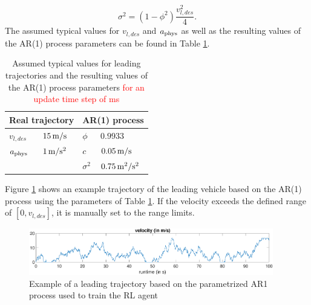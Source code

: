 \documentclass[review]{elsarticle}
\providecommand{\red}[1]{\textcolor{red}{#1}}
\providecommand{\martin}[1]{\red{#1}} %
\providecommand{\sub}[1]{_{\text{{\scriptsize \hspace{-0.0ex}#1}}}}
\providecommand{\3}{{\ss}}
\begin{document}
 \begin{equation}
 \sigma^2=(1-\phi^2)\frac{v_{l,des}^2}{4}.
\end{equation}
The assumed typical values for $v_{l,des}$ and  $a\sub{phys}$ as well as the resulting values of the AR(1) process parameters can be found in Table \ref{tab:AR1Parameters}.

\begin{table}
	\caption{Assumed typical values for leading trajectories and
          the resulting values of the AR(1) process parameters \martin{for an
          update time step of \unit[100]{ms}}} 
	\label{tab:AR1Parameters} 
	\begin{center}
		\begin{tabular}{ p{} p{} |p{} p{}  }
			 \multicolumn{2}{c|}{Real trajectory} & \multicolumn{2}{c}{AR(1) process}   \\ \hline
			$v_{l,des}$ &$\unit[15]{m/s}$ &$\phi$ & $0.9933$\\
			$a\sub{phys}$ &$\unit[1]{m/s^2}$ &$c$ & $\unit[0.05]{m/s}$\\
			& & $\sigma^2$ & $\unit[0.75]{m^2/s^2}$
			
		\end{tabular}
	\end{center}
\end{table}

Figure \ref{fig:AR1process} shows an example trajectory of the leading vehicle based on the AR(1) process using the parameters of Table \ref{tab:AR1Parameters}. If the velocity exceeds the defined range of $[0, v_{l,des}]$, it is manually set to the range limits.
\begin{figure}
	\centering
	\includegraphics[width=0.95\textwidth]{images/AR1process}
	\caption{Example of a leading trajectory based on the parametrized AR1 process used to train the RL agent}
	\label{fig:AR1process}
\end{figure}
\end{document}
